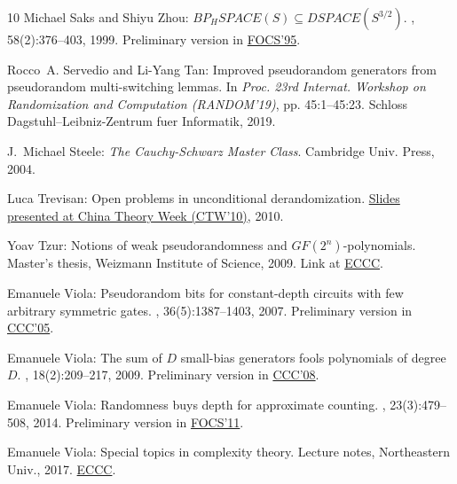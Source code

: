 \documentclass[11pt]{article}
\numberwithin{equation}{section}
\theoremstyle{definition}
\theoremstyle{plain}
\begin{document}
\begin{thebibliography}{10}
{\sc Michael Saks and Shiyu Zhou}: {$BP_H SPACE(S)\subseteq DSPACE(S^{3/2})$}.
, 58(2):376--403, 1999.
\newblock Preliminary version in
  \href{https://doi.org/10.1109/SFCS.1995.492490}{FOCS'95}.

{\sc Rocco~A. Servedio and Li{-}Yang Tan}: Improved pseudorandom generators
  from pseudorandom multi-switching lemmas.
\newblock In {\em Proc. 23rd Internat. Workshop on Randomization and
  Computation (RANDOM'19)}, pp. 45:1--45:23. Schloss Dagstuhl--Leibniz-Zentrum
  fuer Informatik, 2019.

{\sc J.~Michael Steele}: {\em The {C}auchy-{S}chwarz Master Class}.
\newblock Cambridge Univ. Press, 2004.

{\sc Luca Trevisan}: Open problems in unconditional derandomization.
\newblock
  \href{https://conference.iiis.tsinghua.edu.cn/CTW2010/content/Slides/2.pdf}{Slides
  presented at China Theory Week (CTW'10)}, 2010.

{\sc Yoav Tzur}: Notions of weak pseudorandomness and {$GF(2^n)$}-polynomials.
\newblock Master's thesis, Weizmann Institute of Science, 2009.
\newblock Link at
  \href{https://eccc.weizmann.ac.il/static/books/Notions_of_Weak_Pseudorandomness}{ECCC}.

{\sc Emanuele Viola}: Pseudorandom bits for constant-depth circuits with few
  arbitrary symmetric gates.
, 36(5):1387--1403, 2007.
\newblock Preliminary version in
  \href{https://doi.org/10.1109/CCC.2005.25}{CCC'05}.
\newblock [\epfmtdoi{10.1137/050640941}]

{\sc Emanuele Viola}: The sum of {$D$} small-bias generators fools polynomials
  of degree {$D$}.
, 18(2):209--217, 2009.
\newblock Preliminary version in
  \href{https://doi.org/10.1109/CCC.2008.16}{CCC'08}.
\newblock [\epfmtdoi{10.1007/s00037-009-0273-5}]

{\sc Emanuele Viola}: Randomness buys depth for approximate counting.
, 23(3):479--508, 2014.
\newblock Preliminary version in
  \href{https://doi.org/10.1109/FOCS.2011.19}{FOCS'11}.
\newblock [\epfmtdoi{10.1007/s00037-013-0076-6}]

{\sc Emanuele Viola}: Special topics in complexity theory.
\newblock Lecture notes, Northeastern Univ., 2017.
\newblock
  \href{https://eccc.weizmann.ac.il/static/books/Special_Topics_in_Complexity_Theory}{ECCC}.

\end{thebibliography}
\end{document}
